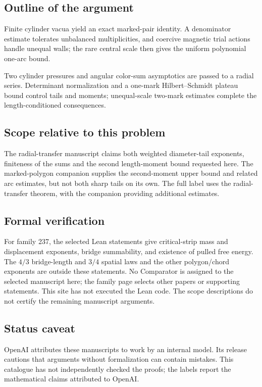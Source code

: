 \documentclass[11pt]{article}
\begin{document}
\subsection{Outline of the argument}
Finite cylinder vacua yield an exact marked-pair identity. A denominator estimate tolerates unbalanced multiplicities, and coercive magnetic trial actions handle unequal walls; the rare central scale then gives the uniform polynomial one-arc bound.

Two cylinder pressures and angular color-sum asymptotics are passed to a radial series. Determinant normalization and a one-mark Hilbert--Schmidt plateau bound control tails and moments; unequal-scale two-mark estimates complete the length-conditioned consequences.

\subsection{Scope relative to this problem}
The radial-transfer manuscript claims both weighted diameter-tail exponents, finiteness of the sums and the second length-moment bound requested here. The marked-polygon companion supplies the second-moment upper bound and related arc estimates, but not both sharp tails on its own. The full label uses the radial-transfer theorem, with the companion providing additional estimates.

\subsection{Formal verification}
For family 237, the selected Lean statements give critical-strip mass and displacement exponents, bridge summability, and existence of pulled free energy. The $4/3$ bridge-length and $3/4$ spatial laws and the other polygon/chord exponents are outside these statements. No Comparator is assigned to the selected manuscript here; the family page selects other papers or supporting statements. This site has not executed the Lean code. The scope descriptions do not certify the remaining manuscript arguments.

\subsection{Status caveat}
OpenAI attributes these manuscripts to work by an internal model. Its release cautions that arguments without formalization can contain mistakes. This catalogue has not independently checked the proofs; the labels report the mathematical claims attributed to OpenAI.
\end{document}
